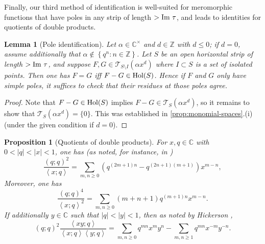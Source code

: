 \documentclass[reqno,11pt]{amsart}
\newtheorem{proposition}[theorem]{Proposition}
\newtheorem{lemma}[theorem]{Lemma}
\theoremstyle{definition}
\theoremstyle{remark}
\numberwithin{equation}{section}
\newcommand{\Z}{\mathbb{Z}}
\newcommand{\C}{\mathbb{C}}
\newcommand{\mT}{\mathcal{T}}
\renewcommand{\Im}{\textnormal{Im}\ }
\newcommand{\Hol}{\textnormal{Hol}}
\newcommand{\la}{\left\langle}
\newcommand{\ra}{\right\rangle}
\newcommand{\fix}[1]{\textcolor{blue}{\large (#1)\normalsize}}
\begin{document}


Finally, our third method of identification is well-suited for meromorphic functions that have poles in any strip of length $> \Im \tau$, and leads to identities for quotients of double products.

\begin{lemma}[Pole identification] \label{lem:proofs-by-pole}
Let $\alpha \in \C^\times$ and $d \in \Z$ with $d \le 0$; if $d = 0$, assume additionally that $\alpha \not\in \left\{q^n : n \in \Z\right\}$. Let $S$ be an open horizontal strip of length $> \Im \tau$, and suppose $F, G \in \mT_{S \setminus I}\left(\alpha x^d\right)$ where $I \subset S$ is a set of isolated points. Then one has $F = G$ iff $F - G \in \Hol(S)$. Hence if $F$ and $G$ only have simple poles, it suffices to check that their residues at those poles agree.
\end{lemma}

\begin{proof}
Note that $F - G \in \Hol(S)$ implies $F - G \in \mT_S\left(\alpha x^d\right)$, so it remains to show that $\mT_S\left(\alpha x^d\right) = \{0\}$. This was established in \cref{prop:monomial-spaces}.(i) (under the given condition if $d = 0$).
\end{proof}

\begin{proposition}[Quotients of double products] \label{prop:fractional}
For $x, q \in \C$ with $0 < |q| < |x| < 1$, one has (as noted, for instance, in \cite[para.\ 486]{tannery1898elements})
\begin{equation} \label{eq:inverse}
    \frac{(q; q)^2}{\la x; q \ra} 
    =
    \sum_{m, n \geq 0} \left( q^{(2m+1)n} - q^{(2n+1)(m+1)}\right) x^{m-n},
\end{equation}
Moreover, one has
\begin{equation} \label{eq:inverse2}
    \frac{(q; q)^4}{\la x; q\ra^2}
    =
    \sum_{m, n \geq 0} \left(m+n+1\right) q^{(m+1)n} x^{m-n}.
\end{equation}
If additionally $y \in \C$ such that $|q| < |y| < 1$, then as noted by Hickerson \cite[Theorem 1.5]{hickerson1988proof},
\begin{equation} \label{eq:fractional}
   (q; q)^2 \frac{ \la xy; q \ra}{\la x; q \ra \la y; q \ra} = 
    \sum_{m, n \ge 0} q^{mn} x^m y^n - \sum_{m, n \ge 1} q^{mn} x^{-m} y^{-n}.
\end{equation}
\end{proposition}
\end{document}
